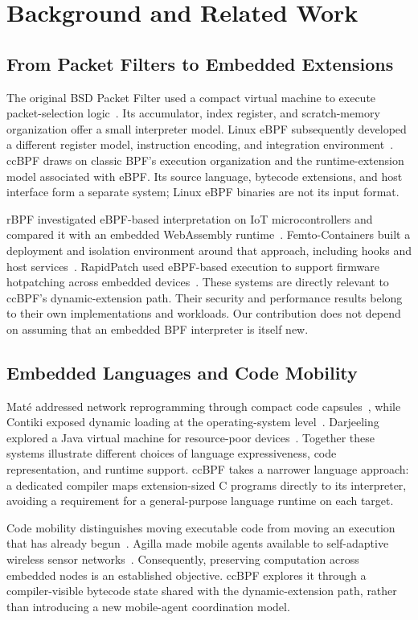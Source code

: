 \documentclass[conference,letterpaper]{IEEEtran}
\begin{document}
\section{Background and Related Work}
\subsection{From Packet Filters to Embedded Extensions}
The original BSD Packet Filter used a compact virtual machine to execute packet-selection logic~\cite{bpf}. Its accumulator, index register, and scratch-memory organization offer a small interpreter model. Linux eBPF subsequently developed a different register model, instruction encoding, and integration environment~\cite{ebpf}. ccBPF draws on classic BPF's execution organization and the runtime-extension model associated with eBPF. Its source language, bytecode extensions, and host interface form a separate system; Linux eBPF binaries are not its input format.

rBPF investigated eBPF-based interpretation on IoT microcontrollers and compared it with an embedded WebAssembly runtime~\cite{rbpf}. Femto-Containers built a deployment and isolation environment around that approach, including hooks and host services~\cite{femto}. RapidPatch used eBPF-based execution to support firmware hotpatching across embedded devices~\cite{rapid}. These systems are directly relevant to ccBPF's dynamic-extension path. Their security and performance results belong to their own implementations and workloads. Our contribution does not depend on assuming that an embedded BPF interpreter is itself new.

\subsection{Embedded Languages and Code Mobility}
Mat\'e addressed network reprogramming through compact code capsules~\cite{mate}, while Contiki exposed dynamic loading at the operating-system level~\cite{contiki}. Darjeeling explored a Java virtual machine for resource-poor devices~\cite{darjeeling}. Together these systems illustrate different choices of language expressiveness, code representation, and runtime support. ccBPF takes a narrower language approach: a dedicated compiler maps extension-sized C programs directly to its interpreter, avoiding a requirement for a general-purpose language runtime on each target.

Code mobility distinguishes moving executable code from moving an execution that has already begun~\cite{mobility}. Agilla made mobile agents available to self-adaptive wireless sensor networks~\cite{agilla}. Consequently, preserving computation across embedded nodes is an established objective. ccBPF explores it through a compiler-visible bytecode state shared with the dynamic-extension path, rather than introducing a new mobile-agent coordination model.
\end{document}

